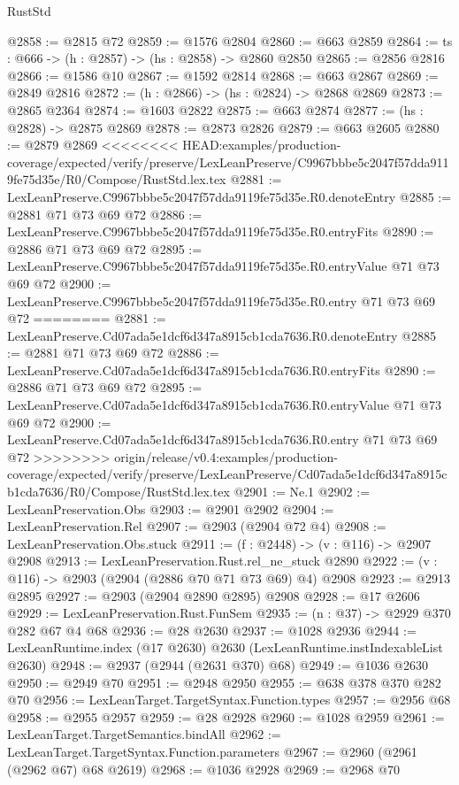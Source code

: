 \begin{lexlean}{RustStd}
\begin{coremodule}
{\begin{coremodule}
{{{{{{{@2858 := @2815 @72
@2859 := @1576 @2804
@2860 := @663 @2859
@2864 := {ts : @666} -> (h : @2857) -> (hs : @2858) -> @2860 @2850
@2865 := @2856 @2816
@2866 := @1586 @10
@2867 := @1592 @2814
@2868 := @663 @2867
@2869 := @2849 @2816
@2872 := (h : @2866) -> (hs : @2824) -> @2868 @2869
@2873 := @2865 @2364
@2874 := @1603 @2822
@2875 := @663 @2874
@2877 := (hs : @2828) -> @2875 @2869
@2878 := @2873 @2826
@2879 := @663 @2605
@2880 := @2879 @2869
<<<<<<<< HEAD:examples/production-coverage/expected/verify/preserve/LexLeanPreserve/C9967bbbe5c2047f57dda9119fe75d35e/R0/Compose/RustStd.lex.tex
@2881 := LexLeanPreserve.C9967bbbe5c2047f57dda9119fe75d35e.R0.denoteEntry
@2885 := @2881 @71 @73 @69 @72
@2886 := LexLeanPreserve.C9967bbbe5c2047f57dda9119fe75d35e.R0.entryFits
@2890 := @2886 @71 @73 @69 @72
@2895 := LexLeanPreserve.C9967bbbe5c2047f57dda9119fe75d35e.R0.entryValue @71 @73 @69 @72
@2900 := LexLeanPreserve.C9967bbbe5c2047f57dda9119fe75d35e.R0.entry @71 @73 @69 @72
========
@2881 := LexLeanPreserve.Cd07ada5e1dcf6d347a8915cb1cda7636.R0.denoteEntry
@2885 := @2881 @71 @73 @69 @72
@2886 := LexLeanPreserve.Cd07ada5e1dcf6d347a8915cb1cda7636.R0.entryFits
@2890 := @2886 @71 @73 @69 @72
@2895 := LexLeanPreserve.Cd07ada5e1dcf6d347a8915cb1cda7636.R0.entryValue @71 @73 @69 @72
@2900 := LexLeanPreserve.Cd07ada5e1dcf6d347a8915cb1cda7636.R0.entry @71 @73 @69 @72
>>>>>>>> origin/release/v0.4:examples/production-coverage/expected/verify/preserve/LexLeanPreserve/Cd07ada5e1dcf6d347a8915cb1cda7636/R0/Compose/RustStd.lex.tex
@2901 := Ne.{1}
@2902 := LexLeanPreservation.Obs
@2903 := @2901 @2902
@2904 := LexLeanPreservation.Rel
@2907 := @2903 (@2904 @72 @4)
@2908 := LexLeanPreservation.Obs.stuck
@2911 := (f : @2448) -> (v : @116) -> @2907 @2908
@2913 := LexLeanPreservation.Rust.rel_ne_stuck @2890
@2922 := (v : @116) -> @2903 (@2904 (@2886 @70 @71 @73 @69) @4) @2908
@2923 := @2913 @2895
@2927 := @2903 (@2904 @2890 @2895) @2908
@2928 := @17 @2606
@2929 := LexLeanPreservation.Rust.FunSem
@2935 := (n : @37) -> @2929 @370 @282 @67 @4 @68
@2936 := @28 @2630
@2937 := @1028 @2936
@2944 := LexLeanRuntime.index (@17 @2630) @2630 (LexLeanRuntime.instIndexableList @2630)
@2948 := @2937 (@2944 (@2631 @370) @68)
@2949 := @1036 @2630
@2950 := @2949 @70
@2951 := @2948 @2950
@2955 := @638 @378 @370 @282 @70
@2956 := LexLeanTarget.TargetSyntax.Function.types
@2957 := @2956 @68
@2958 := @2955 @2957
@2959 := @28 @2928
@2960 := @1028 @2959
@2961 := LexLeanTarget.TargetSemantics.bindAll
@2962 := LexLeanTarget.TargetSyntax.Function.parameters
@2967 := @2960 (@2961 (@2962 @67) @68 @2619)
@2968 := @1036 @2928
@2969 := @2968 @70
}}}}}}}
\end{coremodule}}
\end{coremodule}
\end{lexlean}
